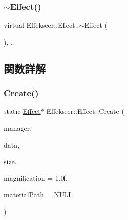 \mbox{\label{class_effekseer_1_1_effect_aeff1be44efe48d64e2b398d9186c1011}} 
\subsubsection{\texorpdfstring{$\sim$\+Effect()}{~Effect()}}
{\footnotesize\ttfamily virtual Effekseer\+::\+Effect\+::$\sim$\+Effect (\begin{DoxyParamCaption}{ }\end{DoxyParamCaption})\hspace{0.3cm}{\ttfamily [inline]}, {\ttfamily [protected]}, {\ttfamily [virtual]}}



\subsection{関数詳解}
\mbox{\label{class_effekseer_1_1_effect_a405ce55b658846f21963f39d8f4bda12}} 
\subsubsection{\texorpdfstring{Create()}{Create()}\hspace{0.1cm}{\footnotesize\ttfamily [1/4]}}
{\footnotesize\ttfamily static \mbox{\hyperlink{class_effekseer_1_1_effect}{Effect}}$\ast$ Effekseer\+::\+Effect\+::\+Create (\begin{DoxyParamCaption}\item[{\mbox{\hyperlink{class_effekseer_1_1_manager}{Manager}} $\ast$}]{manager,  }\item[{\mbox{\hyperlink{namespace_effekseer_ab34c4088e512200cf4c2716f168deb56}{void}} $\ast$}]{data,  }\item[{int32\+\_\+t}]{size,  }\item[{float}]{magnification = {\ttfamily 1.0f},  }\item[{const \mbox{\hyperlink{_effekseer_8h_a50b026abea014b47854bcd835b3b6233}{E\+F\+K\+\_\+\+C\+H\+AR}} $\ast$}]{material\+Path = {\ttfamily NULL} }\end{DoxyParamCaption})\hspace{0.3cm}{\ttfamily [static]}}



